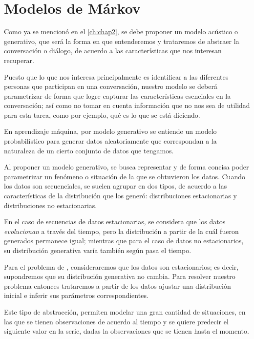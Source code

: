 
\chapter{Modelos de Márkov}\label{ch:chap3}


Como ya se mencionó en el \autoref{ch:chap2}, se debe proponer un modelo acústico o generativo, que será la forma en que entenderemos y trataremos de abstraer la conversación o diálogo, de acuerdo a las características que nos interesan recuperar.

Puesto que lo que nos interesa principalmente es identificar a las diferentes personas que participan en una conversación, nuestro modelo se deberá parametrizar de forma que logre capturar las características esenciales en la conversación; así como no tomar en cuenta información que no nos sea de utilidad para esta tarea, como por ejemplo, qué es lo que se está diciendo.

En aprendizaje máquina, por modelo generativo se entiende un modelo probabilístico para generar datos aleatoriamente que correspondan a la naturaleza de un cierto conjunto de datos que tengamos.

Al proponer un modelo generativo, se busca representar y de forma concisa poder parametrizar un fenómeno o situación de la que se obtuvieron los datos.
Cuando los datos son secuenciales, se suelen agrupar en dos tipos, de acuerdo a las características de la distribución que los generó: distribuciones estacionarias y distribuciones no estacionarias.

En el caso de secuencias de datos estacionarias, se considera que los datos \textit{evolucionan} a través del tiempo, pero la distribución a partir de la cuál fueron generados permanece igual; mientras que para el caso de datos no estacionarios, su distribución generativa varía también según pasa el tiempo.

Para el problema de \sd, consideraremos que los datos son estacionarios; es decir, supondremos que su distribución generativa no cambia. Para resolver nuestro problema entonces trataremos a partir de los datos ajustar una distribución inicial e inferir sus parámetros correspondientes.

Este tipo de abstracción, permiten modelar una gran cantidad de situaciones, en las que se tienen observaciones de acuerdo al tiempo y se quiere predecir el siguiente valor en la serie, dadas la observaciones que se tienen hasta el momento.

